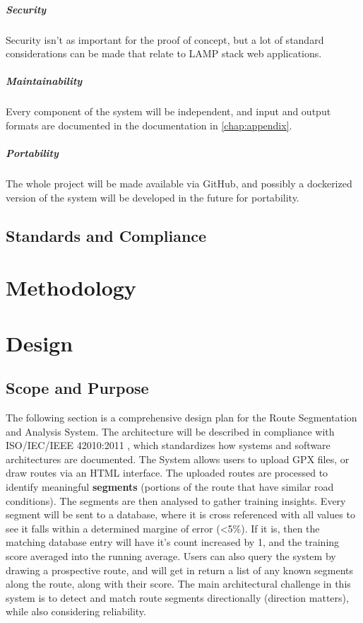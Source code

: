 \documentclass[11pt,a4paper]{report}
\begin{document}
\paragraph{Security}
Security isn't as important for the proof of concept, but a lot of standard considerations can be made that relate to LAMP stack web applications.

\paragraph{Maintainability}
Every component of the system will be independent, and input and output formats are documented in the documentation in \ref{chap:appendix}.

\paragraph{Portability}
The whole project will be made available via GitHub, and possibly a dockerized version of the system will be developed in the future for portability.

\section{Standards and Compliance}
\label{sec:standards}

\chapter{Methodology}
\label{chap:methodology}

\chapter{Design}
\label{chap:design}

\section{Scope and Purpose}
The following section is a comprehensive design plan for the Route Segmentation and Analysis System.
The architecture will be described in compliance with ISO/IEC/IEEE 42010:2011 \citep{ISO42010}, which standardizes how systems
and software architectures are documented.
The System allows users to upload GPX files, or draw routes via an HTML interface. The uploaded routes are processed to
identify meaningful \textbf{segments} (portions of the route that have similar road conditions). The segments are then analysed to
gather training insights. Every segment will be sent to a database, where it is cross referenced with all values to see it falls within a determined
margine of error (<5\%). If it is, then the matching database entry will have it's count increased by 1, and the training score averaged into the running average.
Users can also query the system by drawing a prospective route, and will get in return a list of any known segments along the route, along with their
score. The main architectural challenge in this system is to detect and match route segments directionally (direction matters), while also considering
reliability.
\end{document}
